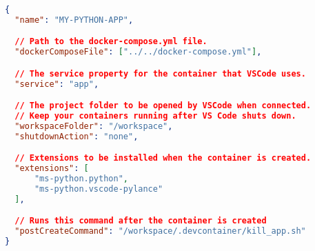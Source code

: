 
\begin{lstlisting}[language=json,caption={\ac{VSCode}s Remote Container \code{devcontainer.json} Configuration File},breaklines=true,label={code::devcontainer_json}]
{
  "name": "MY-PYTHON-APP",

  // Path to the docker-compose.yml file.
  "dockerComposeFile": ["../../docker-compose.yml"],

  // The service property for the container that VSCode uses.
  "service": "app",

  // The project folder to be opened by VSCode when connected.
  // Keep your containers running after VS Code shuts down.
  "workspaceFolder": "/workspace",
  "shutdownAction": "none",

  // Extensions to be installed when the container is created.
  "extensions": [
      "ms-python.python",
      "ms-python.vscode-pylance"
  ],

  // Runs this command after the container is created
  "postCreateCommand": "/workspace/.devcontainer/kill_app.sh"
}


\end{lstlisting}
